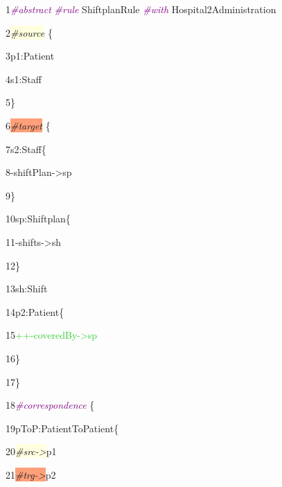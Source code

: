 {

1\hspace{0.5cm}\textcolor{Purple}{\textit{\#abstract}} \textcolor{Purple}{\textit{\#rule}} ShiftplanRule \textcolor{Purple}{\textit{\#with}} Hospital2Administration

2\hspace{0.5cm}\colorbox{LightYellow}{\textit{\#source}} \{

3\hspace{1cm}p1:Patient

4\hspace{1cm}s1:Staff
	
5\hspace{0.5cm}\}

6\hspace{0.5cm}\colorbox{LightSalmon}{\textit{\#target}} \{
	
7\hspace{1cm}s2:Staff\{

8\hspace{1.5cm}-shiftPlan->sp

9\hspace{1cm}\}

10\hspace{1cm}sp:Shiftplan\{

11\hspace{1.5cm}-shifts->sh

12\hspace{1cm}\}

13\hspace{1cm}sh:Shift

14\hspace{1cm}p2:Patient\{

15\hspace{1.5cm}\textcolor{LimeGreen}{++-coveredBy->sp}

16\hspace{1cm}\}

17\hspace{0.5cm}\}

18\hspace{0.5cm}\textcolor{Purple}{\textit{\#correspondence}} \{
		
19\hspace{1cm}pToP:PatientToPatient\{

20\hspace{1.5cm}\colorbox{LightYellow}{\textit{\#src->}}p1

21\hspace{1.5cm}\colorbox{LightSalmon}{\textit{\#trg->}}p2

}

